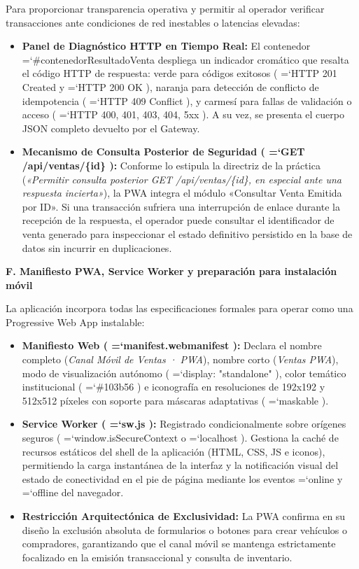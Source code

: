 \documentclass[11pt,a4paper]{article}
\renewcommand{\_}{\oldunderscore\allowbreak}
\DeclareRobustCommand{\texttt}[1]{%
  {\upshape\ttfamily\fontsize{9}{10.8}\selectfont\hyphenchar\font=`\-\relax #1}%
}
\begin{document}
\noindent Para proporcionar transparencia operativa y permitir al operador verificar transacciones ante condiciones de red inestables o latencias elevadas:
\begin{itemize}[leftmargin=*,itemsep=2pt,topsep=1pt]
  \item \textbf{Panel de Diagnóstico HTTP en Tiempo Real:} El contenedor \texttt{\#contenedorResultadoVenta} despliega un indicador cromático que resalta el código HTTP de respuesta: verde para códigos exitosos (\texttt{HTTP 201 Created} y \texttt{HTTP 200 OK}), naranja para detección de conflicto de idempotencia (\texttt{HTTP 409 Conflict}), y carmesí para fallas de validación o acceso (\texttt{HTTP 400, 401, 403, 404, 5xx}). A su vez, se presenta el cuerpo JSON completo devuelto por el Gateway.
  \item \textbf{Mecanismo de Consulta Posterior de Seguridad (\texttt{GET /\allowbreak{}api/\allowbreak{}ventas/\allowbreak{}\{id\}}):} Conforme lo estipula la directriz de la práctica (\textit{«Permitir consulta posterior GET /api/ventas/\{id\}, en especial ante una respuesta incierta»}), la PWA integra el módulo «Consultar Venta Emitida por ID». Si una transacción sufriera una interrupción de enlace durante la recepción de la respuesta, el operador puede consultar el identificador de venta generado para inspeccionar el estado definitivo persistido en la base de datos sin incurrir en duplicaciones.
\end{itemize}

\vspace{0.2cm}
\noindent\textbf{F. Manifiesto PWA, Service Worker y preparación para instalación móvil}

\noindent La aplicación incorpora todas las especificaciones formales para operar como una Progressive Web App instalable:
\begin{itemize}[leftmargin=*,itemsep=2pt,topsep=1pt]
  \item \textbf{Manifiesto Web (\texttt{manifest.\allowbreak{}webmanifest}):} Declara el nombre completo (\textit{Canal Móvil de Ventas · PWA}), nombre corto (\textit{Ventas PWA}), modo de visualización autónomo (\texttt{display: "standalone"}), color temático institucional (\texttt{\#103b56}) e iconografía en resoluciones de 192x192 y 512x512 píxeles con soporte para máscaras adaptativas (\texttt{maskable}).
  \item \textbf{Service Worker (\texttt{sw.js}):} Registrado condicionalmente sobre orígenes seguros (\texttt{window.\allowbreak{}isSecureContext} o \texttt{localhost}). Gestiona la caché de recursos estáticos del shell de la aplicación (HTML, CSS, JS e iconos), permitiendo la carga instantánea de la interfaz y la notificación visual del estado de conectividad en el pie de página mediante los eventos \texttt{online} y \texttt{offline} del navegador.
  \item \textbf{Restricción Arquitectónica de Exclusividad:} La PWA confirma en su diseño la exclusión absoluta de formularios o botones para crear vehículos o compradores, garantizando que el canal móvil se mantenga estrictamente focalizado en la emisión transaccional y consulta de inventario.
\end{itemize}
\end{document}

